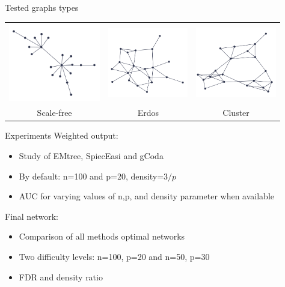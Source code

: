 \documentclass[11pt]{beamer}
\newcommand{\bleu}[1]{\textcolor{Framableulight}{#1}}
\begin{document}


\begin{frame}{Tested graphs types}
    \begin{tabular}{ccc}
       \includegraphics[width=4cm]{images/scale-free.png} &
         \includegraphics[width=3.5cm]{images/erdos.png}&
            \includegraphics[width=3.5cm]{images/cluster.png}\\
            Scale-free & Erdos & Cluster
    \end{tabular} 
\end{frame}
\begin{frame}{Experiments}
\bleu{Weighted output:}\\
\begin{itemize}
\item Study of EMtree, SpiecEasi and gCoda
\item By default: n=100 and p=20, density=$3/p$
\item AUC for varying values of n,p, and density parameter when available
\end{itemize}
\bigskip

\bleu{Final network:}\\
\begin{itemize}
\item Comparison of all methods optimal networks
\item Two difficulty levels: n=100, p=20 and n=50, p=30
\item FDR and density ratio
\end{itemize}
 \end{frame}
\end{document}
